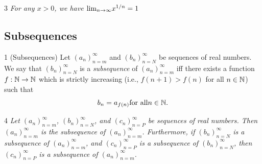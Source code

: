 \begin{lemma}{3}
    \label{lim-x-root-n}
    \emph{For any $x > 0$, we have $\text{lim}_{n \rightarrow \infty}{x^{1/n}} = 1$}
\end{lemma}

\subsection{Subsequences}
\begin{definition}{1}
    \label{subsequence}
    (Subsequences) Let $(a_n)_{n=m}^{\infty}$ and $(b_n)_{n=N}^{\infty}$ be sequences
    of real numbers. We say that $(b_n)_{n=N}^{\infty}$ is a \emph{subsequence} of
    $(a_n)_{n=m}^{\infty}$ iff there exists a function $f: \mathbb{N} \to \mathbb{N}$
    which is strictly increasing (i.e., $f(n + 1) > f(n)$ for all $n \in \mathbb{N}$)
    such that
    \begin{equation*}
        b_n = a_{f(n)} \text{for all} n \in \mathbb{N}.
    \end{equation*}
\end{definition}

\begin{lemma}{4}
    \label{subsequence-properties}
    \emph{Let $(a_n)_{n=m}^{\infty}$, $(b_n)_{n=N}^{\infty}$, and $(c_n)_{n=P}^{\infty}$
    be sequences of real numbers. Then $(a_n)_{n=m}^{\infty}$ is the subsequence
    of $(a_n)_{n=m}^{\infty}$. Furthermore, if $(b_n)_{n=N}^{\infty}$ is a subsequence
    of $(a_n)_{n=m}^{\infty}$, and $(c_n)_{n=P}^{\infty}$ is a subsequence of
    $(b_n)_{n=N}^{\infty}$, then $(c_n)_{n=P}^{\infty}$ is a subsequence of
    $(a_n)_{n=m}^{\infty}$.}
\end{lemma}


